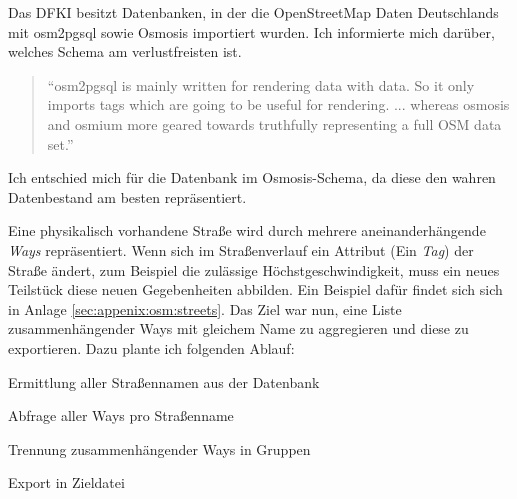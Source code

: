 Das DFKI besitzt Datenbanken, in der die OpenStreetMap Daten Deutschlands mit osm2pgsql sowie Osmosis importiert wurden.
Ich informierte mich darüber, welches Schema am verlustfreisten ist.
\begin{quote}
``osm2pgsql is mainly written for rendering data with data. So it only imports tags which are going to be useful for rendering. ... whereas osmosis and osmium more geared towards truthfully representing a full OSM data set.'' \cite{WEB:Giswiki:Osm2pgsql:2015}
\end{quote}

Ich entschied mich für die Datenbank im Osmosis-Schema, da diese den wahren Datenbestand am besten repräsentiert.

Eine physikalisch vorhandene Straße wird durch mehrere aneinanderhängende \textit{Ways} repräsentiert.
Wenn sich im Straßenverlauf ein Attribut (Ein \textit{Tag}) der Straße ändert, zum Beispiel die zulässige Höchstgeschwindigkeit, muss ein neues Teilstück diese neuen Gegebenheiten abbilden.
Ein Beispiel dafür findet sich sich in Anlage \ref{sec:appenix:osm:streets}.
Das Ziel war nun, eine Liste zusammenhängender Ways mit gleichem Name zu aggregieren und diese zu exportieren. Dazu plante ich folgenden Ablauf:

\begin{compactenum}
  \item Ermittlung aller Straßennamen aus der Datenbank
  \item Abfrage aller Ways pro Straßenname
  \item Trennung zusammenhängender Ways in Gruppen
  \item Export in Zieldatei
\end{compactenum}

